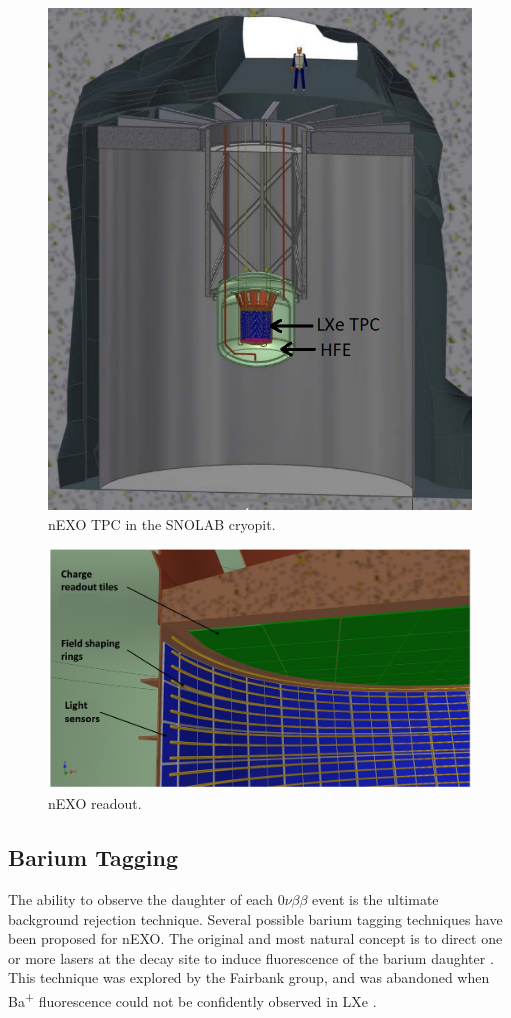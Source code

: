 \begin{figure} %
	\centering
	\includegraphics[width=.7\textwidth]{figures/nEXO_cryopit.png}
	\caption{nEXO TPC in the SNOLAB cryopit.}
\label{fig:nEXO_cryopit}
\end{figure}

\begin{figure} %
	\centering
	\includegraphics[width=.7\textwidth]{figures/nEXO_readout.png}
	\caption{nEXO readout.}
\label{fig:nEXO_readout}
\end{figure}

\subsection{Barium Tagging}

The ability to observe the daughter of each $0\nu\beta\beta$ event is the ultimate background rejection technique.  Several possible barium tagging techniques have been proposed for nEXO.  The original and most natural concept is to direct one or more lasers at the decay site to induce fluorescence of the barium daughter \cite{Moe1991}.  This technique was explored by the Fairbank group, and was abandoned when Ba\textsuperscript{+} fluorescence could not be confidently observed in LXe \cite{Kendy}.

